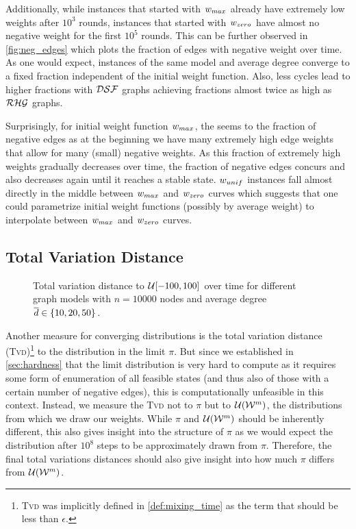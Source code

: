Additionally, while instances that started with $w_{max}$ already have extremely low weights after $10^3$ rounds, instances that started with $w_{zero}$ have almost no negative weight for the first $10^5$ rounds. 
This can be further observed in \cref{fig:neg_edges} which plots the fraction of edges with negative weight over time.
As one would expect, instances of the same model and average degree converge to a fixed fraction independent of the initial weight function.
Also, less cycles lead to higher fractions with $\mathcal{DSF}$ graphs achieving fractions almost twice as high as $\mathcal{RHG}$ graphs.

Surprisingly, for initial weight function $w_{max}$, the \markov seems to  the fraction of negative edges as at the beginning we have many extremely high edge weights that allow for many (small) negative weights.
As this fraction of extremely high weights gradually decreases over time, the fraction of negative edges concurs and also decreases again until it reaches a stable state.
$w_{unif}$ instances fall almost directly in the middle between $w_{max}$ and $w_{zero}$ curves which suggests that one could parametrize initial weight functions (possibly by average weight) to interpolate between $w_{max}$ and $w_{zero}$ curves.


\subsection*{Total Variation Distance}
\begin{figure}[!tb]
  \centering
  \caption{
    Total variation distance to $\mathcal U[-100,100]$ over time for different graph models with $n = 10000$ nodes and average degree $\overline{d} \in \left\{10, 20, 50\right\}$.
  }
  \label{fig:tvd}
\end{figure}

Another measure for converging distributions is the total variation distance (\textsc{Tvd})\footnote{
  \textsc{Tvd} was implicitly defined in \cref{def:mixing_time} as the term that should be less than $\epsilon$.
} to the distribution in the limit $\pi$.
But since we established in \cref{sec:hardness} that the limit distribution is very hard to compute as it requires some form of enumeration of all feasible states (and thus also of those with a certain number of negative edges), this is computationally unfeasible in this context.
Instead, we measure the \textsc{Tvd} not to $\pi$ but to $\mathcal U(\mathcal W^m)$, \ie the distributions from which we draw our weights.
While $\pi$ and $\mathcal U(\mathcal W^m)$ should be inherently different, this also gives insight into the structure of $\pi$ as we would expect the distribution after $10^8$ steps to be approximately drawn from $\pi$.
Therefore, the final total variations distances should also give insight into how much $\pi$ differs from $\mathcal U(\mathcal W^m)$.

